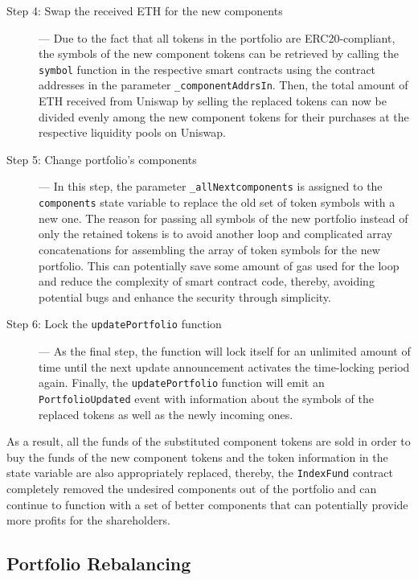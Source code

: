 \begin{description}
  \item[Step 4: Swap the received ETH for the new components] --- Due to the fact that all tokens in the portfolio are ERC20-compliant, the symbols of the new component tokens can be retrieved by calling the \texttt{symbol} function in the respective smart contracts using the contract addresses in the parameter \texttt{\_componentAddrsIn}. Then, the total amount of ETH received from Uniswap by selling the replaced tokens can now be divided evenly among the new component tokens for their purchases at the respective liquidity pools on Uniswap. 
  
  \item[Step 5: Change portfolio's components] --- In this step, the parameter \texttt{\_allNextcomponents} is assigned to the \texttt{components} state variable to replace the old set of token symbols with a new one. The reason for passing all symbols of the new portfolio instead of only the retained tokens is to avoid another loop and complicated array concatenations for assembling the array of token symbols for the new portfolio. This can potentially save some amount of gas used for the loop and reduce the complexity of smart contract code, thereby, avoiding potential bugs and enhance the security through simplicity.
  
  \item[Step 6: Lock the \texttt{updatePortfolio} function] --- As the final step, the function will lock itself for an unlimited amount of time until the next update announcement activates the time-locking period again. Finally, the \texttt{updatePortfolio} function will emit an \texttt{PortfolioUpdated} event with information about the symbols of the replaced tokens as well as the newly incoming ones.
  
\end{description}

As a result, all the funds of the substituted component tokens are sold in order to buy the funds of the new component tokens and the token information in the state variable are also appropriately replaced, thereby, the \texttt{IndexFund} contract completely removed the undesired components out of the portfolio and can continue to function with a set of better components that can potentially provide more profits for the shareholders. 
 
\subsection{Portfolio Rebalancing} \label{subsec:reblance}

